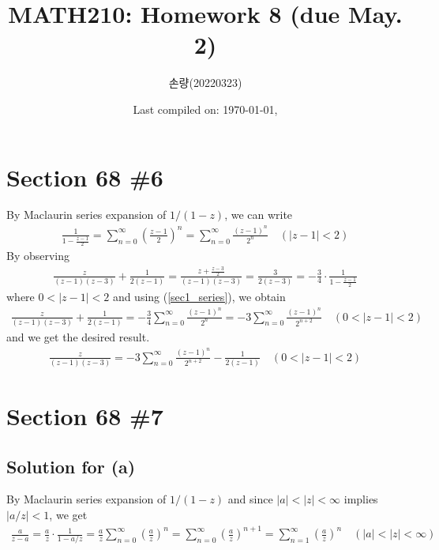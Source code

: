 \documentclass{scrartcl}
\title{MATH210: Homework 8 (due May. 2)}
\author{손량(20220323)}
\date{Last compiled on: \today, \currenttime}
\begin{document}
\maketitle

\section{Section 68 \#6}
By Maclaurin series expansion of \(1 / (1 - z)\), we can write
\begin{align}\label{sec1_series}
  \frac{1}{1 - \frac{z - 1}{2}}
  = \sum^\infty_{n = 0} \left( \frac{z - 1}{2} \right)^n
  = \sum^\infty_{n = 0} \frac{(z - 1)^n}{2^n} \quad (|z - 1| < 2)
\end{align}
By observing
\begin{align*}
  \frac{z}{(z - 1)(z - 3)} + \frac{1}{2(z - 1)} = \frac{z + \frac{z - 3}{2}}{(z - 1)(z - 3)} = \frac{3}{2(z - 3)} = -\frac{3}{4} \cdot \frac{1}{1 - \frac{z - 1}{2}}
\end{align*}
where \(0 < |z - 1| < 2\) and using (\ref{sec1_series}), we obtain
\begin{align*}
  \frac{z}{(z - 1)(z - 3)} + \frac{1}{2(z - 1)}
  = -\frac{3}{4} \sum^\infty_{n = 0} \frac{(z - 1)^n}{2^n}
  = -3 \sum^\infty_{n = 0} \frac{(z - 1)^n}{2^{n + 2}} \quad (0 < |z - 1| < 2)
\end{align*}
and we get the desired result.
\begin{align*}
  \frac{z}{(z - 1)(z - 3)}
  = -3 \sum^\infty_{n = 0} \frac{(z - 1)^n}{2^{n + 2}} - \frac{1}{2(z - 1)} \quad (0 < |z - 1| < 2)
\end{align*}

\section{Section 68 \#7}
\subsection{Solution for (a)}
By Maclaurin series expansion of \(1 / (1 - z)\) and since \(|a| < |z| < \infty\) implies \(|a / z| < 1\), we get
\begin{align*}
  \frac{a}{z - a}
  = \frac{a}{z} \cdot \frac{1}{1 - a / z}
  = \frac{a}{z} \sum^\infty_{n = 0} \left( \frac{a}{z} \right)^n
  = \sum^\infty_{n = 0} \left( \frac{a}{z} \right)^{n + 1}
  = \sum^\infty_{n = 1} \left( \frac{a}{z} \right)^n \quad (|a| < |z| < \infty)
\end{align*}
\end{document}
